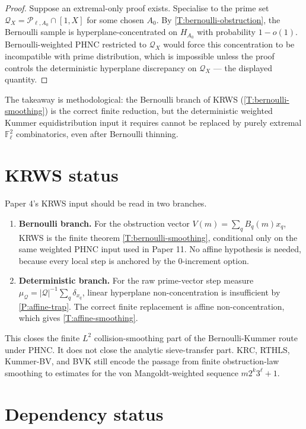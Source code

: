 \documentclass[11pt]{article}
\newcommand{\F}{\mathbb F}
\begin{document}
\begin{proof}
Suppose an extremal-only proof exists.  Specialise to the prime set \(\mathcal Q_X=\mathcal P_{\ell,A_0}\cap[1,X]\) for some chosen \(A_0\).  By \cref{T:bernoulli-obstruction}, the Bernoulli sample is hyperplane-concentrated on \(H_{A_0}\) with probability \(1-o(1)\).  Bernoulli-weighted PHNC restricted to \(\mathcal Q_X\) would force this concentration to be incompatible with prime distribution, which is impossible unless the proof controls the deterministic hyperplane discrepancy on \(\mathcal Q_X\) — the displayed quantity.
\end{proof}

The takeaway is methodological: the Bernoulli branch of KRWS (\cref{T:bernoulli-smoothing}) is the correct finite reduction, but the deterministic weighted Kummer equidistribution input it requires cannot be replaced by purely extremal \(\F_\ell^2\) combinatorics, even after Bernoulli thinning.

\section{KRWS status}

Paper 4's KRWS input should be read in two branches.

\begin{enumerate}[leftmargin=2em]
\item \textbf{Bernoulli branch.}  For the obstruction vector \(V(m)=\sum_qB_q(m)x_q\), KRWS is the finite theorem \cref{T:bernoulli-smoothing}, conditional only on the same weighted PHNC input used in Paper 11.  No affine hypothesis is needed, because every local step is anchored by the \(0\)-increment option.
\item \textbf{Deterministic branch.}  For the raw prime-vector step measure \(\mu_{\mathcal Q}=|\mathcal Q|^{-1}\sum_q\delta_{x_q}\), linear hyperplane non-concentration is insufficient by \cref{P:affine-trap}.  The correct finite replacement is affine non-concentration, which gives \cref{T:affine-smoothing}.
\end{enumerate}

This closes the finite \(L^2\) collision-smoothing part of the Bernoulli-Kummer route under PHNC.  It does not close the analytic sieve-transfer part.  KRC, RTHLS, Kummer-BV, and BVK still encode the passage from finite obstruction-law smoothing to estimates for the von Mangoldt-weighted sequence \(m2^k3^\ell+1\).

\section{Dependency status}
\end{document}
